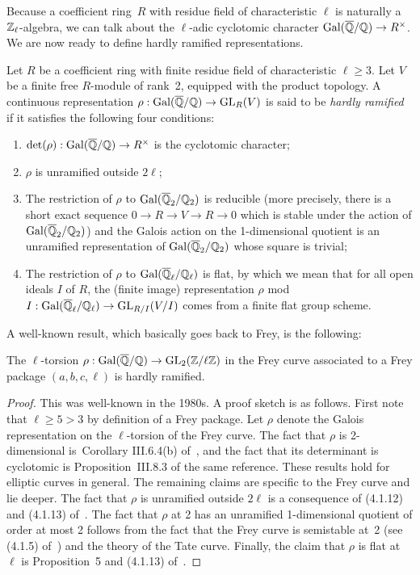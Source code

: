 Because a coefficient ring~$R$ with residue field of characteristic $\ell$ is naturally
a $\mathbb{Z}_\ell$-algebra, we can talk about the $\ell$-adic cyclotomic character $\operatorname{Gal}(\overline{\mathbb{Q}}/\mathbb{Q})\to R^\times$.
We are now ready to define hardly ramified representations.

\begin{definition}
  \label{hardly_ramified}
  \leanok
  Let $R$ be a coefficient ring with finite residue field of characteristic $\ell\geq3$.
  Let $V$ be a finite free $R$-module of rank~2, equipped with the product topology. A
  continuous representation $\rho: \operatorname{Gal}(\overline{\mathbb{Q}}/\mathbb{Q})\to \operatorname{GL}_R(V)$ is said to be \emph{hardly ramified} if it
  satisfies the following four conditions:
  \begin{enumerate}
  \item $\det(\rho):\operatorname{Gal}(\overline{\mathbb{Q}}/\mathbb{Q})\to R^\times$ is the cyclotomic character;
  \item $\rho$ is unramified outside $2\ell$;
  \item The restriction of $\rho$ to $\operatorname{Gal}(\overline{\mathbb{Q}}_2/\mathbb{Q}_2)$ is reducible (more precisely,
  there is a short exact sequence $0\to R\to V\to R\to 0$ which is stable
  under the action of $\operatorname{Gal}(\overline{\mathbb{Q}}_2/\mathbb{Q}_2)$) and the Galois action on the 1-dimensional
  quotient is an unramified representation of $\operatorname{Gal}(\overline{\mathbb{Q}}_2/\mathbb{Q}_2)$ whose square is trivial;
  \item The restriction of $\rho$ to $\operatorname{Gal}(\overline{\mathbb{Q}}_\ell/\mathbb{Q}_\ell)$ is flat, by which we mean that for all open
  ideals $I$ of $R$, the (finite image) representation $\rho$ mod $I:\operatorname{Gal}(\overline{\mathbb{Q}}_\ell/\mathbb{Q}_\ell)\to \operatorname{GL}_{R/I}(V/I)$
  comes from a finite flat group scheme.
  \end{enumerate}
\end{definition}

A well-known result, which basically goes back to Frey, is the following:

\begin{theorem}
  \label{Frey_curve_hardly_ramified}
  \leanok
  The $\ell$-torsion $\rho:\operatorname{Gal}(\overline{\mathbb{Q}}/\mathbb{Q})\to\operatorname{GL}_2(\mathbb{Z}/\ell\mathbb{Z})$ in the Frey curve associated to a Frey
  package $(a,b,c,\ell)$ is hardly ramified.
\end{theorem}
\begin{proof}
  This was well-known in the 1980s. A proof sketch is as follows.
  First note that $\ell\geq5>3$ by definition of a Frey package. Let $\rho$
  denote the Galois representation on the $\ell$-torsion of the Frey curve.
  The fact that $\rho$ is 2-dimensional is~Corollary
  III.6.4(b) of~\cite{silverman1}, and the fact that its determinant is
  cyclotomic is Proposition~III.8.3 of the same reference. These results hold for elliptic curves
  in general. The remaining claims are specific to the Frey curve and lie
  deeper. The fact that $\rho$ is unramified outside $2\ell$ is a consequence
  of (4.1.12) and (4.1.13) of~\cite{serreconj}. The fact that $\rho$ at 2
  has an unramified 1-dimensional quotient of order at most 2 follows from
  the fact that the Frey curve is semistable at~2 (see (4.1.5) of~\cite{serreconj})
  and the theory of the Tate curve. Finally, the claim that $\rho$ is flat at $\ell$
  is Proposition~5 and (4.1.13) of~\cite{serreconj}.
\end{proof}


